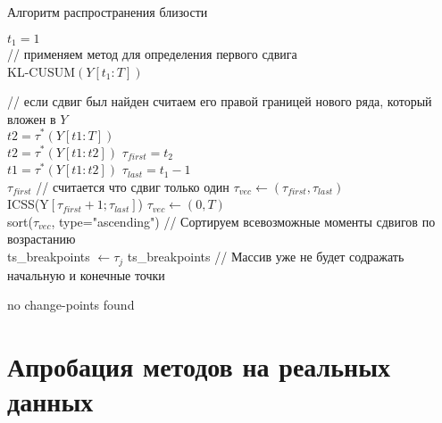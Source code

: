 \documentclass[a4paper,14pt,russian]{extarticle}
\begin{document}
	\begin{algorithm}
		\caption{\label{alg:alg1}Алгоритм распространения близости}
		\SetAlgoLined
		{
			$t_1 = 1$ \\
			// применяем метод для определения первого сдвига \\
			KL-CUSUM$( Y \left[ t_1: T \right] )$ \\
			{
				// если сдвиг был найден считаем его правой границей нового ряда, который вложен в $Y$ \\
				$t2 = \tau^*(Y \left[t1:T\right])$ \\
				{
					$t2 = \tau^*(Y \left[t1:t2\right])$
				}
				$\tau_{first} = t_2$ \\
				{
					$t1 = \tau^*(Y \left[t1:t2\right])$
				}
				$\tau_{last} = t_1 - 1$ \\
				{
					\Return $\tau_{first}$ // считается что сдвиг только один
				}
				{
					$\tau_{vec} \longleftarrow \left(\tau_{first}, \tau_{last}\right)$ \\
					ICSS(Y$\left[\tau_{first} + 1; \tau_{last}\right]$)
				}
				{
					$\tau_{vec} \longleftarrow \left(0, T\right)$ \\
					sort($\tau_{vec}$, type="ascending") // Сортируем всевозможные моменты сдвигов по возрастанию \\
					{
						{
							ts\_breakpoints $\longleftarrow \tau_j$
						}
					}
					\Return ts\_breakpoints // Массив уже не будет содражать начальную и конечные точки \\
				}
				
				
			}{\Return no change-points found}	
		}
		
	\end{algorithm}
	
	\clearpage
	\section{\label{sec:sec3}Апробация методов на реальных данных}
	
\end{document}
